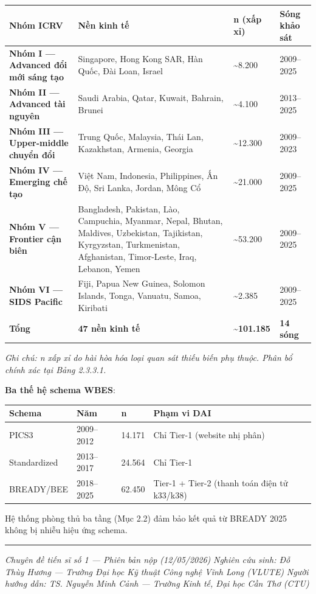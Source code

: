 \documentclass[12pt,a4paper]{article}
\begin{document}
\begin{longtable}[]{@{}llll@{}}
\toprule\noalign{}
Nhóm ICRV & Nền kinh tế & n (xấp xỉ) & Sóng khảo sát \\
\midrule\noalign{}
\endhead
\bottomrule\noalign{}
\endlastfoot
\textbf{Nhóm I --- Advanced đổi mới sáng tạo} & Singapore, Hong Kong
SAR, Hàn Quốc, Đài Loan, Israel & \textasciitilde8.200 & 2009--2025 \\
\textbf{Nhóm II --- Advanced tài nguyên} & Saudi Arabia, Qatar, Kuwait,
Bahrain, Brunei & \textasciitilde4.100 & 2013--2025 \\
\textbf{Nhóm III --- Upper-middle chuyển đổi} & Trung Quốc, Malaysia,
Thái Lan, Kazakhstan, Armenia, Georgia & \textasciitilde12.300 &
2009--2023 \\
\textbf{Nhóm IV --- Emerging chế tạo} & Việt Nam, Indonesia,
Philippines, Ấn Độ, Sri Lanka, Jordan, Mông Cổ & \textasciitilde21.000 &
2009--2025 \\
\textbf{Nhóm V --- Frontier cận biên} & Bangladesh, Pakistan, Lào,
Campuchia, Myanmar, Nepal, Bhutan, Maldives, Uzbekistan, Tajikistan,
Kyrgyzstan, Turkmenistan, Afghanistan, Timor-Leste, Iraq, Lebanon, Yemen
& \textasciitilde53.200 & 2009--2025 \\
\textbf{Nhóm VI --- SIDS Pacific} & Fiji, Papua New Guinea, Solomon
Islands, Tonga, Vanuatu, Samoa, Kiribati & \textasciitilde2.385 &
2009--2025 \\
\textbf{Tổng} & \textbf{47 nền kinh tế} &
\textbf{\textasciitilde101.185} & \textbf{14 sóng} \\
\end{longtable}

\emph{Ghi chú: n xấp xỉ do hài hòa hóa loại quan sát thiếu biến phụ
thuộc. Phân bổ chính xác tại Bảng 2.3.3.1.}

\textbf{Ba thế hệ schema WBES}:

\begin{longtable}[]{@{}llll@{}}
\toprule\noalign{}
Schema & Năm & n & Phạm vi DAI \\
\midrule\noalign{}
\endhead
\bottomrule\noalign{}
\endlastfoot
PICS3 & 2009--2012 & 14.171 & Chỉ Tier-1 (website nhị phân) \\
Standardized & 2013--2017 & 24.564 & Chỉ Tier-1 \\
BREADY/BEE & 2018--2025 & 62.450 & Tier-1 + Tier-2 (thanh toán điện tử
k33/k38) \\
\end{longtable}

Hệ thống phòng thủ ba tầng (Mục 2.2) đảm bảo kết quả từ BREADY 2025
không bị nhiễu hiệu ứng schema.

\begin{center}\rule{0.5\linewidth}{0.5pt}\end{center}

\emph{Chuyên đề tiến sĩ số 1 --- Phiên bản nộp (12/05/2026)}
\emph{Nghiên cứu sinh: Đỗ Thùy Hương --- Trường Đại học Kỹ thuật Công
nghệ Vĩnh Long (VLUTE)} \emph{Người hướng dẫn: TS. Nguyễn Minh Cảnh ---
Trường Kinh tế, Đại học Cần Thơ (CTU)}
\end{document}
